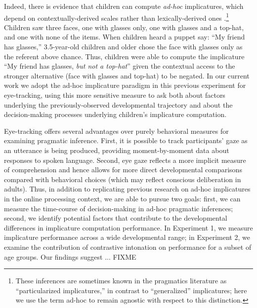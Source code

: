 \documentclass[10pt,letterpaper]{article}
\begin{document}
Indeed, there is evidence that children can compute \emph{ad-hoc} implicatures, which depend on contextually-derived scales rather than lexically-derived ones \cite{stillerLLD}.\footnote{These inferences are sometimes known in the pragmatics literature as ``particularized implicatures,'' in contrast to ``generalized'' implicatures; here we use the term ad-hoc to remain agnostic with respect to this distinction.} Children saw three faces, one with glasses only, one with glasses and a top-hat, and one with none of the items. When children heard a puppet say: ``My friend has glasses,'' 3.5-year-old children and older chose the face with glasses only as the referent above chance. Thus, children were able to compute the implicature ``My friend has glasses, \emph{but not a top-hat}'' given the contextual access to the stronger alternative (face with glasses and top-hat) to be negated. In our current work we adopt the ad-hoc implicature paradigm in this previous experiment for eye-tracking, using this more sensitive measure to ask both about factors underlying the previously-observed developmental trajectory and about the decision-making processes underlying children's implicature computation.



Eye-tracking offers several advantages over purely behavioral measures for examining pragmatic inference. First, it is possible to track participants' gaze as an utterance is being produced, providing moment-by-moment data about responses to spoken language. Second, eye gaze reflects a more implicit measure of comprehension and hence allows for more direct developmental comparisons compared with behavioral choices (which may reflect conscious deliberation in adults). Thus, in addition to replicating previous research on ad-hoc implicatures in the online processing context, we are able to pursue two goals: first, we can measure the time-course of decision-making in ad-hoc pragmatic inferences; second, we identify potential factors that contribute to the developmental differences in implicature computation performance. In Experiment 1, we measure implicature performance across a wide developmental range; in Experiment 2, we examine the contribution of contrastive intonation on performance for a subset of age groups. Our findings suggest ... FIXME %
\end{document}
